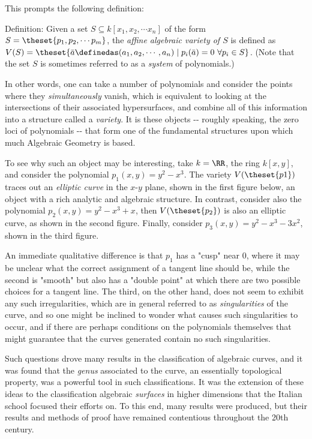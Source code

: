 \documentclass[]{article}
\begin{document}
This prompts the following definition:

Definition: Given a set \(S\subseteq k[x_1, x_2, \cdots x_n]\) of the
form \(S = \theset{p_1, p_2, \cdots p_m}\), the \emph{affine algebraic
variety of \(S\)} is defined as
\(V(S) = \theset{\bar{a} \definedas (a_1, a_2, \cdots, a_n) \mid p_i(\bar{a}) = 0~ \forall p_i \in S}\).
(Note that the set \(S\) is sometimes referred to as a \emph{system} of
polynomials.)

In other words, one can take a number of polynomials and consider the
points where they \emph{simultaneously} vanish, which is equivalent to
looking at the intersections of their associated hypersurfaces, and
combine all of this information into a structure called a
\emph{variety}. It is these objects -\/- roughly speaking, the zero loci
of polynomials -\/- that form one of the fundamental structures upon
which much Algebraic Geometry is based.

To see why such an object may be interesting, take \(k=\RR\), the ring
\(k[x,y]\), and consider the polynomial \(p_1(x,y) = y^2-x^3\). The
variety \(V(\theset{p1})\) traces out an \emph{elliptic curve} in the
\(x\)-\(y\) plane, shown in the first figure below, an object with a
rich analytic and algebraic structure. In contrast, consider also the
polynomial \(p_2(x,y) = y^2-x^3+x\), then \(V(\theset{p_2})\) is also an
elliptic curve, as shown in the second figure. Finally, consider
\(p_3(x,y) = y^{2} - x^{3}-3x^{2}\), shown in the third figure.

An immediate qualitative difference is that \(p_1\) has a "cusp" near 0,
where it may be unclear what the correct assignment of a tangent line
should be, while the second is "smooth" but also has a "double point" at
which there are two possible choices for a tangent line. The third, on
the other hand, does not seem to exhibit any such irregularities, which
are in general referred to as \emph{singularities} of the curve, and so
one might be inclined to wonder what causes such singularities to occur,
and if there are perhaps conditions on the polynomials themselves that
might guarantee that the curves generated contain no such singularities.

Such questions drove many results in the classification of algebraic
curves, and it was found that the \emph{genus} associated to the curve,
an essentially topological property, was a powerful tool in such
classifications. It was the extension of these ideas to the
classification algebraic \emph{surfaces} in higher dimensions that the
Italian school focused their efforts on. To this end, many results were
produced, but their results and methods of proof have remained
contentious throughout the 20th century.
\end{document}
